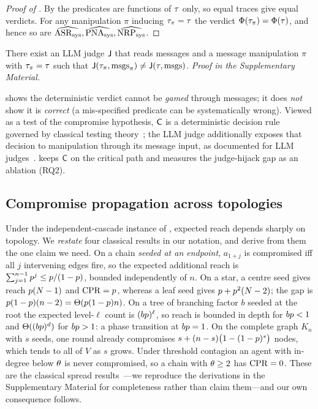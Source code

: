 \begin{proof}[Proof of ]
By  the predicates are functions of $\tau$ only, so equal traces give equal
verdicts. For any manipulation $\pi$ inducing $\tau_\pi=\tau$ the verdict
$\Phi(\tau_\pi)=\Phi(\tau)$, and hence so are
$\widehat{\mathrm{ASR}_{\mathrm{sys}}},\widehat{\mathrm{PNA}_{\mathrm{sys}}},\widehat{\mathrm{NRP}_{\mathrm{sys}}}$.
\end{proof}

\begin{proposition}
\label{prop:judgehijack}
There exist an LLM judge $\mathsf{J}$ that reads messages and a message manipulation $\pi$
with $\tau_\pi=\tau$ such that
$\mathsf{J}(\tau_\pi,\mathrm{msgs}_\pi)\neq\mathsf{J}(\tau,\mathrm{msgs})$.
\emph{Proof in the Supplementary Material.}
\end{proposition}

\begin{remark}
 shows the deterministic verdict cannot be \emph{gamed} through
messages; it does \emph{not} show it is \emph{correct} (a mis-specified predicate can be
systematically wrong). Viewed as a test of the compromise hypothesis, $\mathsf{C}$ is a
deterministic decision rule governed by classical testing
theory~\cite{neyman1933problem,lehmann2005testing}; the LLM judge additionally exposes
that decision to manipulation through its message input, as documented for LLM
judges~\cite{zheng2023judging,wang2023fair}.  keeps $\mathsf{C}$ on the critical
path and measures the judge-hijack gap as an ablation (RQ2).
\end{remark}

\subsection{Compromise propagation across topologies}
\label{sec:theory-prop}
Under the independent-cascade instance of , expected reach depends sharply on
topology. We \emph{restate} four classical results in our notation, and derive from them
the one claim we need. On a chain \emph{seeded at an endpoint}, $a_{1+j}$ is compromised
iff all $j$ intervening edges fire, so the expected additional reach is
$\sum_{j=1}^{n-1}p^{j}\le p/(1-p)$, bounded independently of $n$. On a star, a
centre seed gives reach $p(N-1)$ and $\mathrm{CPR}=p$, whereas a leaf seed gives
$p+p^{2}(N-2)$; the gap is $p(1-p)(n-2)=\Theta(p(1-p)n)$. On a tree
of branching factor $b$ seeded at the root the expected level-$\ell$ count is
$(bp)^{\ell}$, so reach is bounded in depth for $bp<1$ and $\Theta((bp)^{d})$
for $bp>1$: a phase transition at $bp=1$. On the complete graph $K_n$ with $s$
seeds, one round already compromises $s+(n-s)\bigl(1-(1-p)^{s}\bigr)$ nodes, which
tends to all of $V$ as $s$ grows. Under threshold contagion an agent with in-degree below
$\theta$ is never compromised, so a chain with $\theta\ge2$ has $\mathrm{CPR}=0$. These are the
classical spread results~\cite{granovetter1978threshold,watts2002simple,%
kempe2003maximizing,chalupa1979bootstrap}---we reproduce the derivations in the
Supplementary Material for completeness rather than claim them---and our own consequence
follows.


